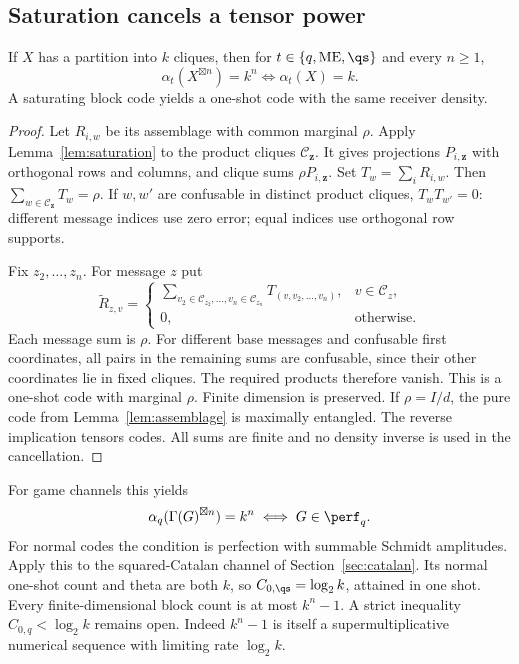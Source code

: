 \subsection{Saturation cancels a tensor power}
\begin{theorem}\label{thm:cancellation}
If $X$ has a partition into $k$ cliques, then for
$t\in\{q,\mathrm{ME},\qs\}$ and every $n\ge1$,
\[
 \alpha_t(X^{\boxtimes n})=k^n\iff\alpha_t(X)=k.
\]
A saturating block code yields a one-shot code with the same receiver
density.
\end{theorem}
\begin{proof}
Let $R_{i,w}$ be its assemblage with common marginal $\rho$. Apply
Lemma~\ref{lem:saturation} to the product cliques $\mathcal C_{\mathbf z}$.
It gives projections $P_{i,\mathbf z}$ with orthogonal rows and columns,
and clique sums $\rho P_{i,\mathbf z}$. Set $T_w=\sum_iR_{i,w}$.
Then $\sum_{w\in\mathcal C_{\mathbf z}}T_w=\rho$. If $w,w'$ are
confusable in distinct product cliques, $T_wT_{w'}=0$: different message
indices use zero error; equal indices use orthogonal row supports.

Fix $z_2,\ldots,z_n$. For message $z$ put
\[
 \widetilde R_{z,v}=
 \begin{cases}
 \displaystyle\sum_{v_2\in\mathcal C_{z_2},\ldots,v_n\in\mathcal C_{z_n}}
 T_{(v,v_2,\ldots,v_n)},&v\in\mathcal C_z,\\0,&\text{otherwise}.
 \end{cases}
\]
Each message sum is $\rho$. For different base messages and confusable
first coordinates, all pairs in the remaining sums are confusable,
since their other coordinates lie in fixed cliques. The required
products therefore vanish. This is a one-shot code with marginal
$\rho$. Finite dimension is preserved. If $\rho=I/d$, the pure code
from Lemma~\ref{lem:assemblage} is maximally entangled. The reverse
implication tensors codes. All sums are finite and no density inverse
is used in the cancellation.
\end{proof}

For game channels this yields
\[
 \alpha_q(\Gamma(G)^{\boxtimes n})=k^n
 \iff G\in\perf_q.
\]
For normal codes the condition is perfection with summable Schmidt
amplitudes. Apply this to the squared-Catalan channel of
Section~\ref{sec:catalan}. Its normal one-shot count and theta are both
$k$, so $C_{0,\qs}=\log_2k$, attained in one shot. Every finite-dimensional
block count is at most $k^n-1$. A strict inequality
$C_{0,q}<\log_2k$ remains open. Indeed $k^n-1$ is itself a
supermultiplicative numerical sequence with limiting rate $\log_2k$.

